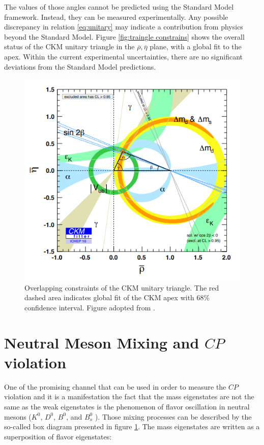 The values of those angles cannot be predicted using the Standard Model framework. Instead, they can be measured experimentally. Any possible discrepancy in relation \ref{eq:unitary} may indicate a contribution from physics beyond the Standard Model. Figure \ref{fig:traingle constrains} shows the overall status of the CKM unitary triangle in the $\overline{\rho}, \overline{\eta}$ plane, with a global fit to the apex. Within the current experimental uncertainties, there are no significant deviations from the Standard Model predictions. 

\begin{figure}
\centering
\includegraphics[scale=0.6]{figures/Unitary_triangle_constrains.PNG}
\caption{Overlapping constraints of the CKM unitary triangle. The red dashed area indicates global fit of the CKM apex with 68\% confidence interval. Figure adopted from \cite{CKMFitter}.
\label{fig:triangle}}
\end{figure}


\section{Neutral Meson Mixing and $CP$ violation}

One of the promising channel that can be used in order to measure the $CP$ violation and it is a manifestation the fact that the mass eigenstates are not the same as the weak eigenstates is the phenomenon of flavor oscillation in neutral mesons ($K^0$, $D^0$, $B^0$, and $B^0_ s$ ). 
Those mixing processes can be described by the so-called box diagram presented in figure \ref{}. 
The mass eigenstates are written as a superposition of flavor eigenstates:

